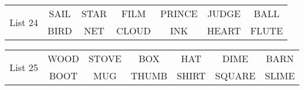 \documentclass{article}
\begin{document}
\vspace{.1in}
\hspace{.5in}\begin{tabular}{r||c c c c c c }
\multirow{2}{*}{List 24} & SAIL & STAR & FILM & PRINCE & JUDGE & BALL\\
\cline{2-7}			& BIRD & NET & CLOUD & INK & HEART & FLUTE\\
\end{tabular}

\vspace{.1in}
\hspace{.5in}\begin{tabular}{r||c c c c c c }
\multirow{2}{*}{List 25} & WOOD & STOVE & BOX & HAT & DIME & BARN\\
\cline{2-7}			& BOOT & MUG & THUMB & SHIRT & SQUARE & SLIME\\
\end{tabular}
\end{document}
